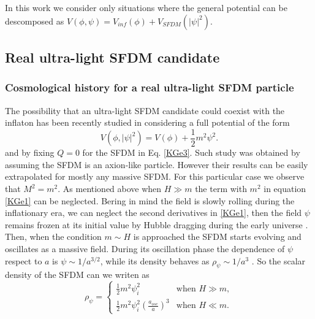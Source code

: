 \documentclass[amssymb,twocolumn,prd,nofootinbib,showpacs]{revtex4-1}
\begin{document}
In this work we consider only situations where the general potential can be descomposed as $V(\phi,\psi)=V_{inf}(\phi)+V_{SFDM}(|\psi|^2)$.

\subsection{Real ultra-light SFDM candidate}
\subsubsection{Cosmological history for a real ultra-light SFDM particle}
The  possibility  that  an  ultra-light  SFDM  candidate could  coexist  with  the  inflaton  has  been  recently  studied in \cite{SFrev2} considering a full potential of the form
\begin{equation}\label{potential_massive}
V(\phi,|\psi|^2)=V(\phi)+\frac{1}{2}m^2\psi^2.
\end{equation}
%
and by fixing $Q=0$ for the SFDM in Eq. \eqref{KGe3}. Such study was obtained by assuming the SFDM is an axion-like particle. However their results can be easily extrapolated for mostly any massive SFDM. For this particular case we observe that  $M^2=m^2$. As mentioned above when $H\gg m$ the term with $m^2$ 
in equation \eqref{KGe1} can be neglected. Bering in mind the field is slowly rolling during the inflationary era, 
we can neglect the second derivatives in \eqref{KGe1}, then the field $\psi$ remains frozen at its initial value by 
Hubble dragging during the early universe \cite{curvatonatractor}. 
%
Then, when the condition $m\sim H$ is approached the SFDM starts evolving and oscillates as a massive field. 
During its oscillation phase the dependence of $\psi$ respect to $a$ is $\psi\sim 1/a^{3/2}$, while its density 
behaves as $\rho_{\psi}\sim 1/a^3$  \cite{SFphi41,SFphi42}. So the scalar density of the SFDM can we writen as
\begin{equation}\label{rhosfdm}
\rho_\psi = \left\lbrace\begin{array}{ll}
\frac{1}{2}m^2\psi_i^2 & \text{when }H\gg m, \\
\frac{1}{2}m^2\psi_i^2\left(\frac{a_{osc}}{a}\right)^3 & \text{when }H\ll m.
\end{array}\right .
\end{equation}
\end{document}
